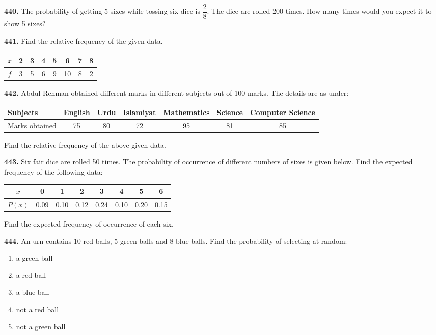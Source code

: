 \documentclass[11pt]{article}
\begin{document}
\bigskip
\noindent\textbf{440.} The probability of getting 5 sixes while tossing six dice is $\dfrac{2}{8}$. The dice are rolled 200 times. How many times would you expect it to show 5 sixes?

\bigskip
\noindent\textbf{441.} Find the relative frequency of the given data.

\begin{center}
\begin{tabular}{|c|c|c|c|c|c|c|c|}
\hline
$x$ & 2 & 3 & 4 & 5 & 6 & 7 & 8 \\
\hline
$f$ & 3 & 5 & 6 & 9 & 10 & 8 & 2 \\
\hline
\end{tabular}
\end{center}

\bigskip
\noindent\textbf{442.} Abdul Rehman obtained different marks in different subjects out of 100 marks. The details are as under:

\begin{center}
\begin{tabular}{|l|c|c|c|c|c|c|}
\hline
Subjects & English & Urdu & Islamiyat & Mathematics & Science & Computer Science \\
\hline
Marks obtained & 75 & 80 & 72 & 95 & 81 & 85 \\
\hline
\end{tabular}
\end{center}

Find the relative frequency of the above given data.

\bigskip
\noindent\textbf{443.} Six fair dice are rolled 50 times. The probability of occurrence of different numbers of sixes is given below. Find the expected frequency of the following data:

\begin{center}
\begin{tabular}{|c|c|c|c|c|c|c|c|}
\hline
$x$ & 0 & 1 & 2 & 3 & 4 & 5 & 6 \\
\hline
$P(x)$ & 0.09 & 0.10 & 0.12 & 0.24 & 0.10 & 0.20 & 0.15 \\
\hline
\end{tabular}
\end{center}

Find the expected frequency of occurrence of each six.

\bigskip
\noindent\textbf{444.} An urn contains 10 red balls, 5 green balls and 8 blue balls. Find the probability of selecting at random:
\begin{enumerate}[label=(\roman*)]
\item a green ball
\item a red ball
\item a blue ball
\item not a red ball
\item not a green ball
\end{enumerate}
\end{document}
